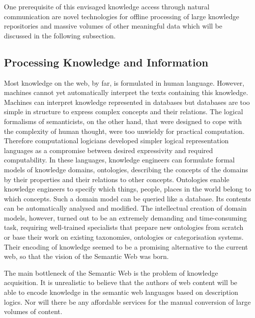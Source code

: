 \documentclass[10pt, plain]{../../metanetpaper}
\begin{document}
\begin{multicols}{2}
One prerequisite of this envisaged knowledge access through natural communication are novel technologies for offline processing of large knowledge repositories and massive volumes of other meaningful data which will be discussed in the following subsection.  

\subsection{Processing Knowledge and Information}
\label{sec:proc-knowl-inform}

Most knowledge on the web, by far, is formulated in human language. However, machines cannot yet automatically interpret the texts containing this knowledge. Machines can interpret knowledge represented in databases but databases are too simple in structure to express complex concepts and their relations. The logical formalisms of semanticists, on the other hand, that were designed to cope with the complexity of human thought, were too unwieldy for practical computation. Therefore computational logicians developed simpler logical representation languages as a compromise between desired expressivity and required computability. In these languages, knowledge engineers can formulate formal models of knowledge domains, ontologies,  describing the concepts of the domains by their properties and their relations to other concepts. Ontologies enable knowledge engineers to specify which things, people, places in the world belong to which concepts. Such a domain model can be queried like a database. Its contents can be automatically analysed and modified. The intellectual creation of domain models, however, turned out to be an extremely demanding and time-consuming task, requiring well-trained specialists that prepare new ontologies from scratch or base their work on existing taxonomies, ontologies or categorisation systems. Their encoding of knowledge seemed to be a promising alternative to the current web, so that the vision of the Semantic Web was born. 
 
The main bottleneck of the Semantic Web is the problem of knowledge acquisition. It is unrealistic to believe that the authors of web content will be able to encode knowledge in the semantic web languages based on description logics. Nor will there be any affordable services for the manual conversion of large volumes of content.
 

\end{multicols}
\end{document}
